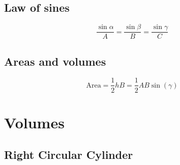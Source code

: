 \documentclass[letterpaper,9pt,fleqn]{extarticle}
\begin{document}
\begin{multicols*}{2}
\subsection*{Law of sines}
\[
    \frac{\sin{\alpha}}{A} =  \frac{\sin{\beta}}{B} =  \frac{\sin{\gamma}}{C}
\]

\subsection*{Areas and volumes}

\[
    \mbox{Area} = \frac{1}{2} hB =   \frac{1}{2} A B \sin(\gamma)
\]


\section*{Volumes}

\begin{comment}
\subsection*{Rectangle}
\begin{minipage}[c]{0.333\textwidth}
\begin{tikzpicture}[thick]
\coordinate (O) at (0,0);
\coordinate (A) at (2,0);
\coordinate (B) at (2,1);
\coordinate (C) at (0,1);
\draw (O)--(A)--(B)--(C)--cycle;

\tkzLabelSegment[below=2pt](O,A){$\ell$}
\tkzLabelSegment[above right=2pt](A,B){$w$}


\end{tikzpicture}

\[
   \mbox{Area} = \ell \times w
\]
\[
   \mbox{Perimeter} = 2 \ell  +  2 w
\]

\end{minipage}
\subsection*{Circle}

\[
   \mbox{Area} = \uppi  \times \mbox{radius}^2
\]
\[
   \mbox{Circumference} = 2 \uppi  \times \mbox{radius}
\]
\end{comment}
\subsection*{Right Circular Cylinder}


\end{multicols*}
\end{document}
